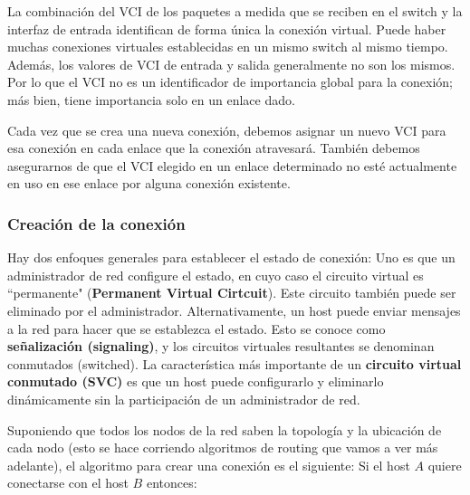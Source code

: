  La combinación del VCI de los paquetes a medida que se reciben en el switch y la interfaz de entrada identifican de forma única la conexión virtual. Puede haber muchas conexiones virtuales establecidas en un mismo switch al mismo tiempo. Además, los valores de VCI de entrada y salida generalmente no son los mismos. Por lo que el VCI no es un identificador de importancia global para la conexión; más bien, tiene importancia solo en un enlace dado.

 Cada vez que se crea una nueva conexión, debemos asignar un nuevo VCI para esa conexión en cada enlace que la conexión atravesará. También debemos asegurarnos de que el VCI elegido en un enlace determinado no esté actualmente en uso en ese enlace por alguna conexión existente.

\subsubsection{Creación de la conexión}
 Hay dos enfoques generales para establecer el estado de conexión: Uno es que un administrador de red configure el estado, en cuyo caso el circuito virtual es ``permanente" (\textbf{Permanent Virtual Cirtcuit}). Este circuito también puede ser eliminado por el administrador. Alternativamente, un host puede enviar mensajes a la red para hacer que se establezca el estado. Esto se conoce como \textbf{señalización (signaling)}, y los circuitos virtuales resultantes se denominan conmutados (switched). La característica más importante de un \textbf{circuito virtual conmutado (SVC)} es que un host puede configurarlo y eliminarlo dinámicamente sin la participación de un administrador de red.

 Suponiendo que todos los nodos de la red saben la topología y la ubicación de cada nodo (esto se hace corriendo algoritmos de routing que vamos a ver más adelante), el algoritmo para crear una conexión es el siguiente: Si el host \(A\) quiere conectarse con el host \(B\) entonces:

